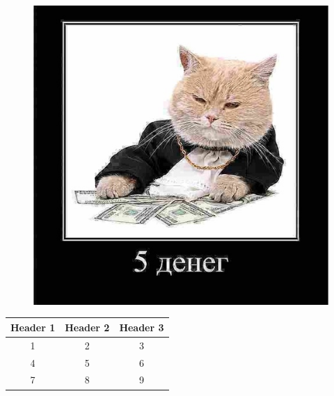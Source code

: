 \documentclass{article}
\begin{document}
\begin{figure}[h!]
    \centering
    \includegraphics[scale=0.5]{5money}
    \caption{}
    \label{fig:5 money}
\end{figure}
\begin{center}
\begin{tabular}{||c c c ||}
\hline
Header 1 & Header 2 & Header 3 \\
\hline
1 & 2 & 3 \\
\hline
4 & 5 & 6 \\
\hline
7 & 8 & 9 \\
\hline
\end{tabular}
\end{center}
\end{document}

